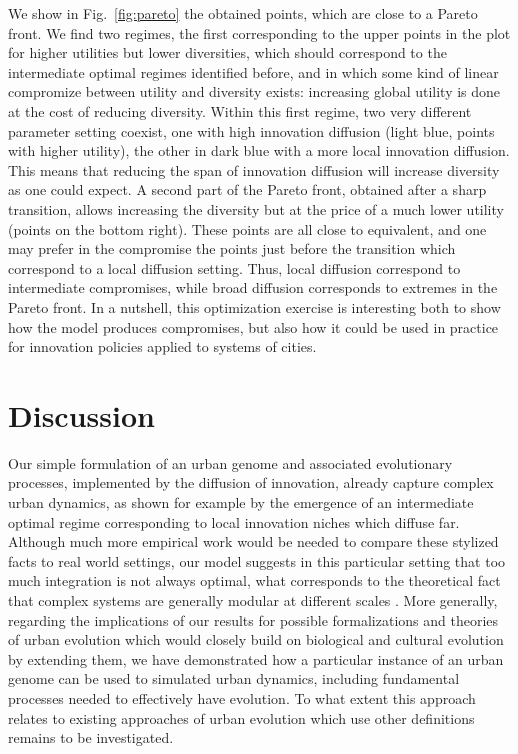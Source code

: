 \documentclass[letterpaper]{article}
\begin{document}
We show in Fig.~\ref{fig:pareto} the obtained points, which are close to a Pareto front. We find two regimes, the first corresponding to the upper points in the plot for higher utilities but lower diversities, which should correspond to the intermediate optimal regimes identified before, and in which some kind of linear compromize between utility and diversity exists: increasing global utility is done at the cost of reducing diversity. Within this first regime, two very different parameter setting coexist, one with high innovation diffusion (light blue, points with higher utility), the other in dark blue with a more local innovation diffusion. This means that reducing the span of innovation diffusion will increase diversity as one could expect. A second part of the Pareto front, obtained after a sharp transition, allows increasing the diversity but at the price of a much lower utility (points on the bottom right). These points are all close to equivalent, and one may prefer in the compromise the points just before the transition which correspond to a local diffusion setting. Thus, local diffusion correspond to intermediate compromises, while broad diffusion corresponds to extremes in the Pareto front. In a nutshell, this optimization exercise is interesting both to show how the model produces compromises, but also how it could be used in practice for innovation policies applied to systems of cities.



\section{Discussion}

Our simple formulation of an urban genome and associated evolutionary processes, implemented by the diffusion of innovation, already capture complex urban dynamics, as shown for example by the emergence of an intermediate optimal regime corresponding to local innovation niches which diffuse far. Although much more empirical work would be needed to compare these stylized facts to real world settings, our model suggests in this particular setting that too much integration is not always optimal, what corresponds to the theoretical fact that complex systems are generally modular at different scales \citep{ethiraj2004modularity}. More generally, regarding the implications of our results for possible formalizations and theories of urban evolution which would closely build on biological and cultural evolution by extending them, we have demonstrated how a particular instance of an urban genome can be used to simulated urban dynamics, including fundamental processes needed to effectively have evolution. To what extent this approach relates to existing approaches of urban evolution which use other definitions remains to be investigated.
\end{document}
